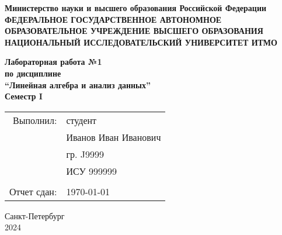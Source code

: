\documentclass[a4paper,12pt]{article}
\begin{document}
	
	\begin{center}
		\textbf{Министерство науки и высшего образования Российской Федерации} \\
		\vspace{0.2cm}
		\textbf{ФЕДЕРАЛЬНОЕ ГОСУДАРСТВЕННОЕ АВТОНОМНОЕ} \\
		\textbf{ОБРАЗОВАТЕЛЬНОЕ УЧРЕЖДЕНИЕ ВЫСШЕГО ОБРАЗОВАНИЯ} \\
		\textbf{НАЦИОНАЛЬНЫЙ ИССЛЕДОВАТЕЛЬСКИЙ УНИВЕРСИТЕТ ИТМО} \\
	\end{center}
	
	\vspace{5cm}
	
	\begin{center}
		\textbf{\LARGE{Лабораторная работа №1 \\
				по дисциплине \\``Линейная алгебра и анализ данных''}} \\
		\vspace{1cm}
		\textbf{\LARGE{Семестр I}}
	\end{center}
	
	\vspace{5cm}
	
	\begin{flushright}
		\begin{tabular}{rl}
			Выполнил: & студент \\
			& Иванов Иван Иванович \\
			& гр. J9999 \\
			& ИСУ 999999 \\
			\\
			Отчет сдан: & \today \\
		\end{tabular}
	\end{flushright}
	
	\vspace{4cm}
	
	\begin{center}
		Санкт-Петербург \\
		2024
	\end{center}
	
\end{document}
